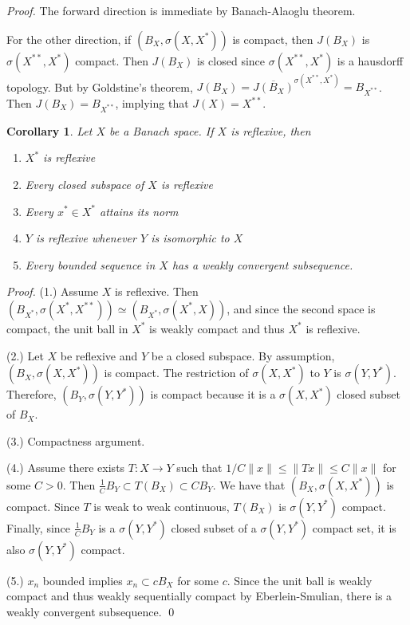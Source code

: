 \documentclass[11pt, reqno]{article}
\theoremstyle{plain}
\newtheorem*{corollary}{Corollary}
\theoremstyle{definition}
\theoremstyle{remark}
\begin{document}
\textit{Proof.} The forward direction is immediate by Banach-Alaoglu theorem. 

For the other direction, if $(B_X, \sigma(X, X^*))$ is compact, then $J(B_X)$ is $\sigma(X^{**}, X^*)$ compact.
Then $J(B_X)$ is closed since $\sigma(X^{**}, X^*)$ is a hausdorff topology. But by Goldstine's theorem,
$J(B_X) = \overline{J(B_X)}^{\sigma(X^{**}, X^*)} = B_{X^{**}}$. Then $J(B_X) = B_{X^{**}}$, implying
that $J(X) = X^{**}$.

\begin{corollary}
    Let $X$ be a Banach space. If $X$ is reflexive, then 
    \begin{enumerate}
        \item $X^*$ is reflexive
        \item Every closed subspace of $X$ is reflexive
        \item Every $x^* \in X^*$ attains its norm
        \item $Y$ is reflexive whenever $Y$ is isomorphic to $X$
        \item Every bounded sequence in $X$ has a weakly convergent subsequence.
    \end{enumerate}
\end{corollary}

\textit{Proof.} (1.) Assume $X$ is reflexive. Then $(B_{X^*}, \sigma(X^*, X^{**})) \simeq (B_{X^*}, \sigma(X^*, X))$,
and since the second space is compact, the unit ball in $X^*$ is weakly compact and thus $X^*$ is reflexive.

(2.) Let $X$ be reflexive and $Y$ be a closed subspace. By assumption, $(B_X, \sigma(X, X^*))$ is compact. 
The restriction of $\sigma(X, X^*)$ to $Y$ is $\sigma(Y, Y^*)$. Therefore, $(B_Y, \sigma(Y, Y^*))$ is compact because it is 
a $\sigma(X, X^*)$ closed subset of $B_X$. 

(3.) Compactness argument.

(4.) Assume there exists $T: X \rightarrow Y$ such that $1/C\|x\| \leq \|Tx\| \leq C\|x\|$ for some $C> 0$. 
Then $\frac{1}{C} B_Y \subset T(B_X) \subset C B_Y$. We have that $(B_X, \sigma(X, X^*))$ is compact. Since $T$ is 
weak to weak continuous, $T(B_X)$ is $\sigma(Y, Y^*)$ compact. Finally, since $\frac{1}{C}B_Y$ is a $\sigma(Y,Y^*)$ 
closed subset of a $\sigma(Y, Y^*)$ compact set, it is also $\sigma(Y, Y^*)$ compact. 

(5.) $x_n$ bounded implies $x_n \subset c B_X$ for some $c$. Since the unit ball is weakly compact and thus weakly 
sequentially compact by Eberlein-Smulian, there is a weakly convergent subsequence. \hfill \qed
\end{document}
